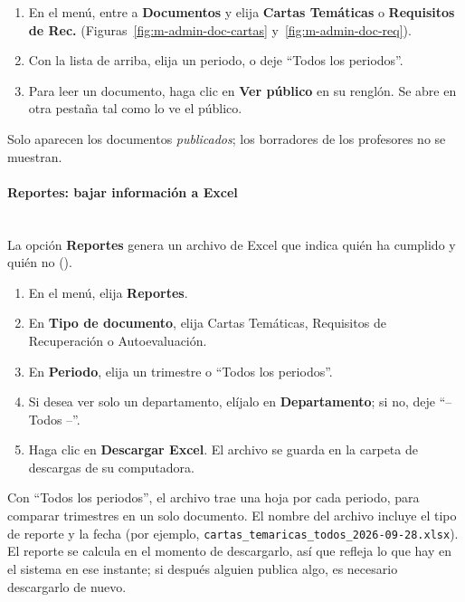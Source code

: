 \begin{enumerate}
    \item En el menú, entre a \textbf{Documentos} y elija \textbf{Cartas Temáticas} o \textbf{Requisitos de Rec.} (Figuras~\ref{fig:m-admin-doc-cartas} y~\ref{fig:m-admin-doc-req}).
    \item Con la lista de arriba, elija un periodo, o deje ``Todos los periodos''.
    \item Para leer un documento, haga clic en \textbf{Ver público} en su renglón. Se abre en otra pestaña tal como lo ve el público.
\end{enumerate}

Solo aparecen los documentos \emph{publicados}; los borradores de los profesores no se muestran.



\paragraph{Reportes: bajar información a Excel}\label{apx:manual-user:admin-reportes}\mbox{}\\
La opción \textbf{Reportes} genera un archivo de Excel que indica quién ha cumplido y quién no ().

\begin{enumerate}
    \item En el menú, elija \textbf{Reportes}.
    \item En \textbf{Tipo de documento}, elija Cartas Temáticas, Requisitos de Recuperación o Autoevaluación.
    \item En \textbf{Periodo}, elija un trimestre o ``Todos los periodos''.
    \item Si desea ver solo un departamento, elíjalo en \textbf{Departamento}; si no, deje ``-- Todos --''.
    \item Haga clic en \textbf{Descargar Excel}. El archivo se guarda en la carpeta de descargas de su computadora.
\end{enumerate}

Con ``Todos los periodos'', el archivo trae una hoja por cada periodo, para comparar trimestres en un solo documento. El nombre del archivo incluye el tipo de reporte y la fecha (por ejemplo, \texttt{cartas\_temaricas\_todos\_2026-09-28.xlsx}). El reporte se calcula en el momento de descargarlo, así que refleja lo que hay en el sistema en ese instante; si después alguien publica algo, es necesario descargarlo de nuevo.


